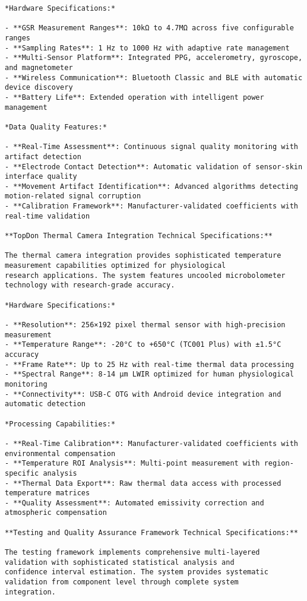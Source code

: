 \documentclass[11pt,a4paper]{report}
\begin{document}
\begin{verbatim}
*Hardware Specifications:*

- **GSR Measurement Ranges**: 10kΩ to 4.7MΩ across five configurable ranges
- **Sampling Rates**: 1 Hz to 1000 Hz with adaptive rate management
- **Multi-Sensor Platform**: Integrated PPG, accelerometry, gyroscope, and magnetometer
- **Wireless Communication**: Bluetooth Classic and BLE with automatic device discovery
- **Battery Life**: Extended operation with intelligent power management

*Data Quality Features:*

- **Real-Time Assessment**: Continuous signal quality monitoring with artifact detection
- **Electrode Contact Detection**: Automatic validation of sensor-skin interface quality
- **Movement Artifact Identification**: Advanced algorithms detecting motion-related signal corruption
- **Calibration Framework**: Manufacturer-validated coefficients with real-time validation

**TopDon Thermal Camera Integration Technical Specifications:**

The thermal camera integration provides sophisticated temperature measurement capabilities optimized for physiological
research applications. The system features uncooled microbolometer technology with research-grade accuracy.

*Hardware Specifications:*

- **Resolution**: 256×192 pixel thermal sensor with high-precision measurement
- **Temperature Range**: -20°C to +650°C (TC001 Plus) with ±1.5°C accuracy
- **Frame Rate**: Up to 25 Hz with real-time thermal data processing
- **Spectral Range**: 8-14 μm LWIR optimized for human physiological monitoring
- **Connectivity**: USB-C OTG with Android device integration and automatic detection

*Processing Capabilities:*

- **Real-Time Calibration**: Manufacturer-validated coefficients with environmental compensation
- **Temperature ROI Analysis**: Multi-point measurement with region-specific analysis
- **Thermal Data Export**: Raw thermal data access with processed temperature matrices
- **Quality Assessment**: Automated emissivity correction and atmospheric compensation

**Testing and Quality Assurance Framework Technical Specifications:**

The testing framework implements comprehensive multi-layered validation with sophisticated statistical analysis and
confidence interval estimation. The system provides systematic validation from component level through complete system
integration.


\end{verbatim}
\end{document}
